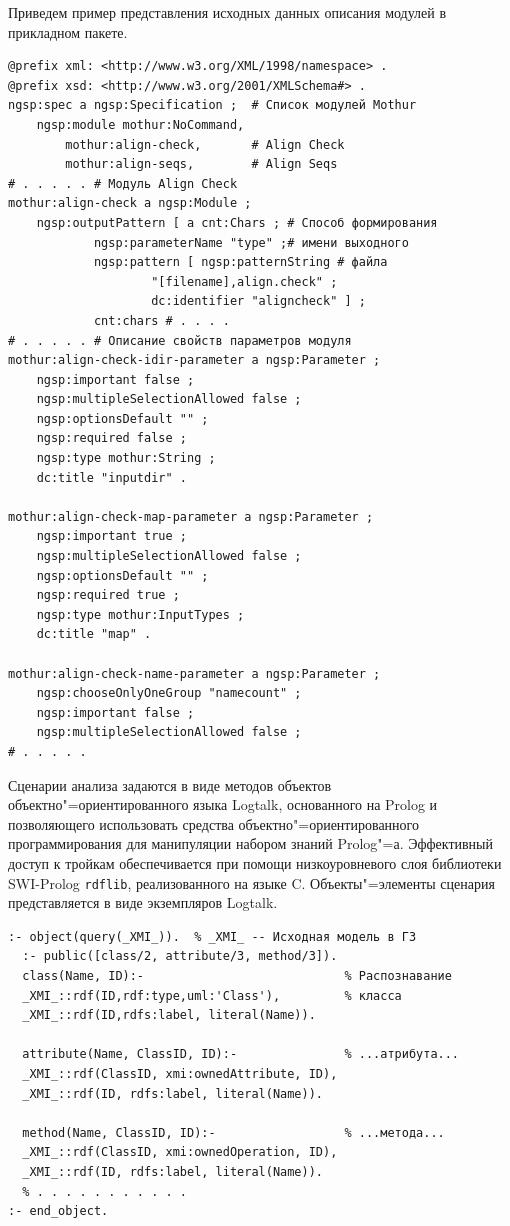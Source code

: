 \documentclass[12pt]{article}
\begin{document}
Приведем пример представления исходных данных описания модулей в прикладном пакете.
\begin{verbatim}
@prefix xml: <http://www.w3.org/XML/1998/namespace> .
@prefix xsd: <http://www.w3.org/2001/XMLSchema#> .
ngsp:spec a ngsp:Specification ;  # Список модулей Mothur
    ngsp:module mothur:NoCommand,
        mothur:align-check,       # Align Check
        mothur:align-seqs,        # Align Seqs
# . . . . . # Модуль Align Check
mothur:align-check a ngsp:Module ;
    ngsp:outputPattern [ a cnt:Chars ; # Способ формирования
            ngsp:parameterName "type" ;# имени выходного
            ngsp:pattern [ ngsp:patternString # файла
                    "[filename],align.check" ;
                    dc:identifier "aligncheck" ] ;
            cnt:chars # . . . .
# . . . . . # Описание свойств параметров модуля
mothur:align-check-idir-parameter a ngsp:Parameter ;
    ngsp:important false ;
    ngsp:multipleSelectionAllowed false ;
    ngsp:optionsDefault "" ;
    ngsp:required false ;
    ngsp:type mothur:String ;
    dc:title "inputdir" .

mothur:align-check-map-parameter a ngsp:Parameter ;
    ngsp:important true ;
    ngsp:multipleSelectionAllowed false ;
    ngsp:optionsDefault "" ;
    ngsp:required true ;
    ngsp:type mothur:InputTypes ;
    dc:title "map" .

mothur:align-check-name-parameter a ngsp:Parameter ;
    ngsp:chooseOnlyOneGroup "namecount" ;
    ngsp:important false ;
    ngsp:multipleSelectionAllowed false ;
# . . . . .
\end{verbatim}

Сценарии анализа задаются в виде методов объектов объектно"=ориентированного языка Logtalk, основанного на Prolog и позволяющего использовать средства объектно"=ориентированного программирования для манипуляции набором знаний Prolog"=а. Эффективный доступ к тройкам обеспечивается при помощи низкоуровневого слоя библиотеки SWI-Prolog \texttt{rdflib}, реализованного на языке C.  Объекты"=элементы сценария представляется в виде экземпляров Logtalk.

\begin{verbatim}
:- object(query(_XMI_)).  % _XMI_ -- Исходная модель в ГЗ
  :- public([class/2, attribute/3, method/3]).
  class(Name, ID):-                            % Распознавание
  _XMI_::rdf(ID,rdf:type,uml:'Class'),         % класса
  _XMI_::rdf(ID,rdfs:label, literal(Name)).

  attribute(Name, ClassID, ID):-               % ...атрибута...
  _XMI_::rdf(ClassID, xmi:ownedAttribute, ID),
  _XMI_::rdf(ID, rdfs:label, literal(Name)).

  method(Name, ClassID, ID):-                  % ...метода...
  _XMI_::rdf(ClassID, xmi:ownedOperation, ID),
  _XMI_::rdf(ID, rdfs:label, literal(Name)).
  % . . . . . . . . . . .
:- end_object.
\end{verbatim}
\end{document}
